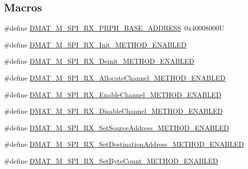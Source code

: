 \subsection*{Macros}
\begin{DoxyCompactItemize}
\item 
\#define \hyperlink{group___d_m_a_t___m___s_p_i___r_x__module_ga2b87420b02143eb629eeaf050f013832}{D\-M\-A\-T\-\_\-\-M\-\_\-\-S\-P\-I\-\_\-\-R\-X\-\_\-\-P\-R\-P\-H\-\_\-\-B\-A\-S\-E\-\_\-\-A\-D\-D\-R\-E\-S\-S}~0x40008000\-U
\item 
\#define \hyperlink{group___d_m_a_t___m___s_p_i___r_x__module_ga22afcc40e87d19ea041dc2ffba388a81}{D\-M\-A\-T\-\_\-\-M\-\_\-\-S\-P\-I\-\_\-\-R\-X\-\_\-\-Init\-\_\-\-M\-E\-T\-H\-O\-D\-\_\-\-E\-N\-A\-B\-L\-E\-D}
\item 
\#define \hyperlink{group___d_m_a_t___m___s_p_i___r_x__module_ga4a30fdf122e815fe09c9d458ee46400c}{D\-M\-A\-T\-\_\-\-M\-\_\-\-S\-P\-I\-\_\-\-R\-X\-\_\-\-Deinit\-\_\-\-M\-E\-T\-H\-O\-D\-\_\-\-E\-N\-A\-B\-L\-E\-D}
\item 
\#define \hyperlink{group___d_m_a_t___m___s_p_i___r_x__module_ga741b5257c4e5c47754b3497a53d4107a}{D\-M\-A\-T\-\_\-\-M\-\_\-\-S\-P\-I\-\_\-\-R\-X\-\_\-\-Allocate\-Channel\-\_\-\-M\-E\-T\-H\-O\-D\-\_\-\-E\-N\-A\-B\-L\-E\-D}
\item 
\#define \hyperlink{group___d_m_a_t___m___s_p_i___r_x__module_gac8fbba4dc9c0e1a6a7ae250ec139880b}{D\-M\-A\-T\-\_\-\-M\-\_\-\-S\-P\-I\-\_\-\-R\-X\-\_\-\-Enable\-Channel\-\_\-\-M\-E\-T\-H\-O\-D\-\_\-\-E\-N\-A\-B\-L\-E\-D}
\item 
\#define \hyperlink{group___d_m_a_t___m___s_p_i___r_x__module_ga07feca53feb6ed18e4b127d2c6a47248}{D\-M\-A\-T\-\_\-\-M\-\_\-\-S\-P\-I\-\_\-\-R\-X\-\_\-\-Disable\-Channel\-\_\-\-M\-E\-T\-H\-O\-D\-\_\-\-E\-N\-A\-B\-L\-E\-D}
\item 
\#define \hyperlink{group___d_m_a_t___m___s_p_i___r_x__module_gabde2738def16db40fb21be72d1d73f70}{D\-M\-A\-T\-\_\-\-M\-\_\-\-S\-P\-I\-\_\-\-R\-X\-\_\-\-Set\-Source\-Address\-\_\-\-M\-E\-T\-H\-O\-D\-\_\-\-E\-N\-A\-B\-L\-E\-D}
\item 
\#define \hyperlink{group___d_m_a_t___m___s_p_i___r_x__module_gacceb269aced889d48800b338d18a028b}{D\-M\-A\-T\-\_\-\-M\-\_\-\-S\-P\-I\-\_\-\-R\-X\-\_\-\-Set\-Destination\-Address\-\_\-\-M\-E\-T\-H\-O\-D\-\_\-\-E\-N\-A\-B\-L\-E\-D}
\item 
\#define \hyperlink{group___d_m_a_t___m___s_p_i___r_x__module_ga83c8c5ab01515f939c3bae35a0eae477}{D\-M\-A\-T\-\_\-\-M\-\_\-\-S\-P\-I\-\_\-\-R\-X\-\_\-\-Set\-Byte\-Count\-\_\-\-M\-E\-T\-H\-O\-D\-\_\-\-E\-N\-A\-B\-L\-E\-D}

\end{DoxyCompactItemize}
